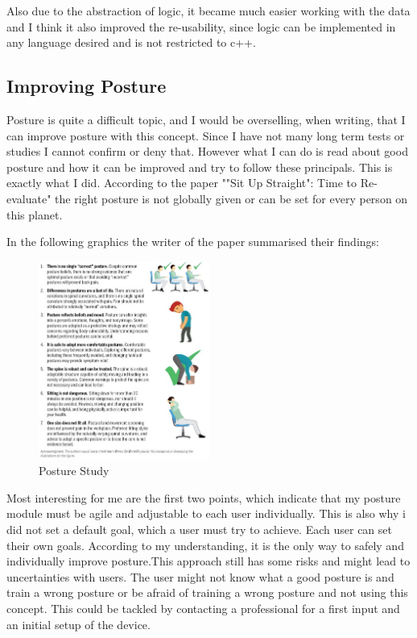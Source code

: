 Also due to the abstraction of logic, it became much easier working with the data and I think it also improved the re-usability, since logic can be implemented in any language desired and is not restricted to c++.

\subsection{Improving Posture}

Posture is quite a difficult topic, and I would be overselling, when writing, that I can improve posture with this concept. Since I have not many long term tests or studies I cannot confirm or deny that. However what I can do is read about good posture and how it can be improved and try to follow these principals. This is exactly what I did. According to the paper ""Sit Up Straight": Time to Re-evaluate" \cite{SitUpSt77:online} the right posture is not globally given or can be set for every person on this planet. 

In the following graphics the writer of the paper summarised their findings:
\begin{figure}[h]
  \begin{center}
\includegraphics[width=0.5\textwidth]{images/jospt-562-fig001.jpg}
  \end{center}
  \caption{Posture Study}
  \label{fig:Posture Study}
\end{figure}

Most interesting for me are the first two points, which indicate that my posture module must be agile and adjustable to each user individually. This is also why i did not set a default goal, which a user must try to achieve. Each user can set their own goals. According to my understanding, it is the only way to safely and individually improve posture.This approach still has some risks and might lead to uncertainties with users. 
The user might not know what a good posture is and train a wrong posture or be afraid of training a wrong posture and not using this concept. This could be tackled by contacting a professional for a first input and an initial setup of the device.

